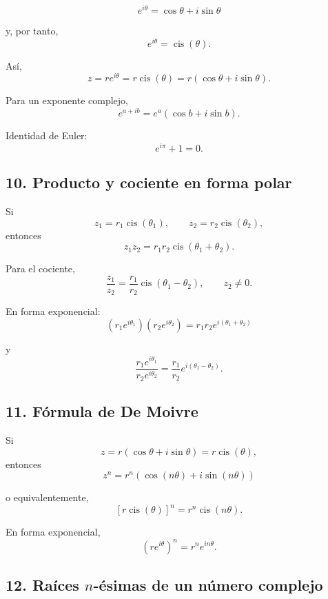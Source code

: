 \documentclass[12pt]{article}
\begin{document}
\[
\boxed{
e^{i\theta}
=
\cos\theta+i\sin\theta
}
\]

y, por tanto,
\[
\boxed{
e^{i\theta}
=
\operatorname{cis}(\theta).
}
\]

Así,
\[
\boxed{
z=re^{i\theta}
=
r\operatorname{cis}(\theta)
=
r(\cos\theta+i\sin\theta).
}
\]

Para un exponente complejo,
\[
\boxed{
e^{a+ib}
=
e^a(\cos b+i\sin b).
}
\]

Identidad de Euler:
\[
\boxed{
e^{i\pi}+1=0.
}
\]

\subsection*{10. Producto y cociente en forma polar}

Si
\[
z_1=r_1\operatorname{cis}(\theta_1),
\qquad
z_2=r_2\operatorname{cis}(\theta_2),
\]
entonces
\[
\boxed{
z_1z_2
=
r_1r_2
\operatorname{cis}(\theta_1+\theta_2).
}
\]

Para el cociente,
\[
\boxed{
\frac{z_1}{z_2}
=
\frac{r_1}{r_2}
\operatorname{cis}(\theta_1-\theta_2)
},
\qquad z_2\neq0.
\]

En forma exponencial:
\[
\boxed{
(r_1e^{i\theta_1})(r_2e^{i\theta_2})
=
r_1r_2e^{i(\theta_1+\theta_2)}
}
\]

y
\[
\boxed{
\frac{r_1e^{i\theta_1}}
     {r_2e^{i\theta_2}}
=
\frac{r_1}{r_2}
e^{i(\theta_1-\theta_2)}.
}
\]

\subsection*{11. Fórmula de De Moivre}

Si
\[
z=r(\cos\theta+i\sin\theta)
=
r\operatorname{cis}(\theta),
\]
entonces
\[
\boxed{
z^n
=
r^n
\left(
\cos(n\theta)+i\sin(n\theta)
\right)
}
\]

o equivalentemente,
\[
\boxed{
\left[r\operatorname{cis}(\theta)\right]^n
=
r^n\operatorname{cis}(n\theta).
}
\]

En forma exponencial,
\[
\boxed{
\left(re^{i\theta}\right)^n
=
r^ne^{in\theta}.
}
\]

\subsection*{12. Raíces $n$-ésimas de un número complejo}
\end{document}
